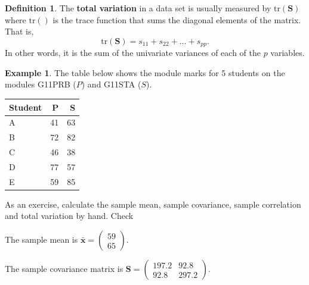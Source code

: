 \documentclass[]{book}
\theoremstyle{definition}
\newtheorem{definition}{Definition}[chapter]
\theoremstyle{definition}
\newtheorem{example}{Example}[chapter]
\theoremstyle{definition}
\theoremstyle{remark}
\begin{document}
\begin{definition}
\protect\hypertarget{def:totalvar}{}{\label{def:totalvar} }The \textbf{total variation} in a data set is usually measured by \(\text{tr}(\boldsymbol S)\) where \(\text{tr}()\) is the trace function that sums the diagonal elements of the matrix. That is,
\[\text{tr}(\boldsymbol S) = s_{11} + s_{22} + \ldots + s_{pp}.\]
In other words, it is the sum of the univariate variances of each of the \(p\) variables.
\end{definition}

\begin{example}
\protect\hypertarget{exm:unnamed-chunk-7}{}{\label{exm:unnamed-chunk-7} }The table below shows the module marks for 5 students on the modules G11PRB (\(P\)) and G11STA (\(S\)).
\end{example}

\begin{table}[H]
\centering
\begin{tabular}{lrr}
\toprule
Student & P & S\\
\midrule
A & 41 & 63\\
B & 72 & 82\\
C & 46 & 38\\
D & 77 & 57\\
E & 59 & 85\\
\bottomrule
\end{tabular}
\end{table}

As an exercise, calculate the sample mean, sample covariance, sample correlation and total variation by hand. Check

The sample mean is \(\bar{\boldsymbol x} = \begin{pmatrix} 59 \\ 65 \end{pmatrix}\).

The sample covariance matrix is \(\boldsymbol S= \begin{pmatrix} 197.2 & 92.8 \\ 92.8 & 297.2 \end{pmatrix}\).
\end{document}
